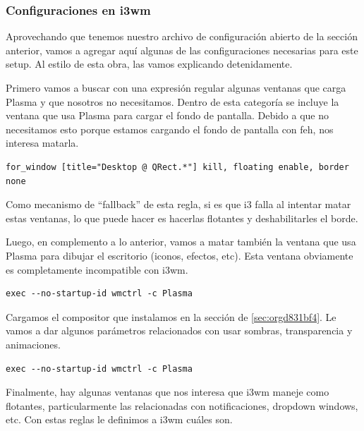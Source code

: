 \documentclass[11pt]{article}
\begin{document}
\subsubsection{Configuraciones en i3wm}
\label{sec:org62c8dcf}

Aprovechando que tenemos nuestro archivo de configuración abierto de la sección anterior, vamos a agregar aquí algunas de las configuraciones necesarias para este setup. Al estilo de esta obra, las vamos explicando detenidamente.

Primero vamos a buscar con una expresión regular algunas ventanas que carga Plasma y que nosotros no necesitamos. Dentro de esta categoría se incluye la ventana que usa Plasma para cargar el fondo de pantalla. Debido a que no necesitamos esto porque estamos cargando el fondo de pantalla con feh, nos interesa matarla.

\begin{verbatim}
for_window [title="Desktop @ QRect.*"] kill, floating enable, border none
\end{verbatim}

Como mecanismo de ``fallback'' de esta regla, si es que i3 falla al intentar matar estas ventanas, lo que puede hacer es hacerlas flotantes y deshabilitarles el borde.

Luego, en complemento a lo anterior, vamos a matar también la ventana que usa Plasma para dibujar el escritorio (iconos, efectos, etc). Esta ventana obviamente es completamente incompatible con i3wm.

\begin{verbatim}
exec --no-startup-id wmctrl -c Plasma
\end{verbatim}

Cargamos el compositor que instalamos en la sección de \ref{sec:orgd831bf4}. Le vamos a dar algunos parámetros relacionados con usar sombras, transparencia y animaciones.

\begin{verbatim}
exec --no-startup-id wmctrl -c Plasma
\end{verbatim}

Finalmente, hay algunas ventanas que nos interesa que i3wm maneje como flotantes, particularmente las relacionadas con notificaciones, dropdown windows, etc. Con estas reglas le definimos a i3wm cuáles son.
\end{document}

